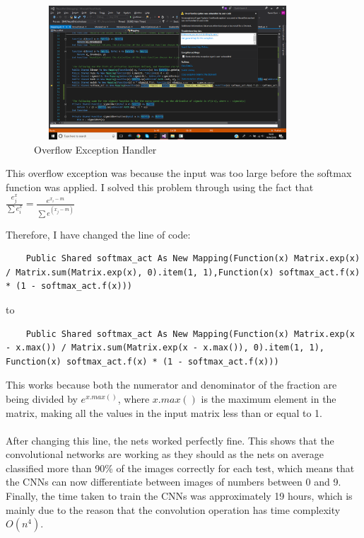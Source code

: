\begin{figure}[H]
    \centering
    \includegraphics[width=10cm, height=5cm]{Testing/ConvTests/ExceptionHandlerConv1.png}
    \caption{Overflow Exception Handler}
    \label{TestNo3ResultsP2}
    
\end{figure}

This overflow exception was because the input was too large before the softmax function was applied. I solved this problem through using the fact that $ \frac{e^x_j}{\sum{e^x_i}} = \frac{e^{x_i - m}}{\sum{e^{(x_j - m)}}}$

Therefore, I have changed the line of code:

\begin{verbatim}
    Public Shared softmax_act As New Mapping(Function(x) Matrix.exp(x) / Matrix.sum(Matrix.exp(x), 0).item(1, 1),Function(x) softmax_act.f(x) * (1 - softmax_act.f(x)))
\end{verbatim}
to 
\begin{verbatim}
    Public Shared softmax_act As New Mapping(Function(x) Matrix.exp(x - x.max()) / Matrix.sum(Matrix.exp(x - x.max()), 0).item(1, 1), Function(x) softmax_act.f(x) * (1 - softmax_act.f(x)))
\end{verbatim}

This works because both the numerator and denominator of the fraction are being divided by $e^{x.max()}$, where $x.max()$ is the maximum element in the matrix, making all the values in the input matrix less than or equal to 1.
\\ \\
After changing this line, the nets worked perfectly fine. This shows that the convolutional networks are working as they should as the nets on average classified more than 90\% of the images correctly for each test, which means that the CNNs can now differentiate between images of numbers between 0 and 9. Finally, the time taken to train the CNNs was approximately 19 hours, which is mainly due to the reason that the convolution operation has time complexity $O(n^4)$.
